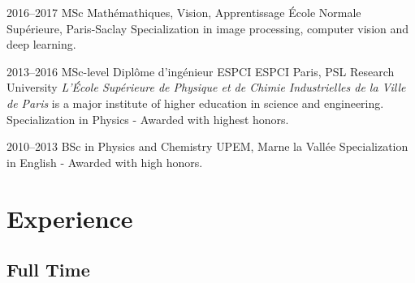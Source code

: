 \documentclass[]{friggeri-cv} %
\begin{document}
\begin{entrylist}

\entry
{2016--2017}
{MSc {\normalfont Mathémathiques, Vision, Apprentissage}}
{École Normale Supérieure, Paris-Saclay}
{Specialization in image processing, computer vision and deep learning.}

\entry
{2013--2016}
{MSc{\normalfont-level Diplôme d’ingénieur ESPCI}}
{ESPCI Paris, PSL Research University}
{\emph{L'École Supérieure de Physique et de Chimie Industrielles de la Ville de Paris} is a major institute of higher education in science and engineering.\\ Specialization in Physics - Awarded with highest honors.}



\entry
{2010--2013}
{BSc {\normalfont in Physics and Chemistry}}
{UPEM, Marne la Vallée}
{Specialization in English - Awarded with high honors.}


\end{entrylist}


\section{Experience}

\subsection{Full Time}
\end{document}
